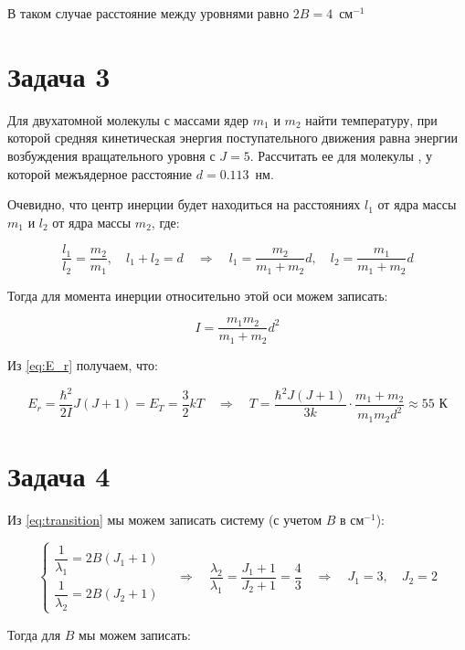 \documentclass[a4paper, 12pt]{article}
\newcommand{\qrq}
{\ensuremath{\quad \Rightarrow \quad}} %
\begin{document}
В таком случае расстояние между уровнями равно $2B = 4$~см$^{-1}$ 

\section*{Задача 3}

Для двухатомной молекулы с массами ядер $m_1$ и $m_2$ найти температуру, при которой средняя кинетическая энергия поступательного движения равна энергии возбуждения вращательного уровня с $J = 5$. Рассчитать ее для молекулы , у которой межъядерное расстояние $d= 0.113$~нм.

Очевидно, что центр инерции будет находиться на расстояниях $l_1$ от ядра массы $m_1$ и $l_2$ от ядра массы $m_2$, где:

\begin{equation}
	\frac{l_1}{l_2} = \frac{m_2}{m_1}, \quad l_1 + l_2 = d \qrq l_1 = \frac{m_2}{m_1 + m_2}d, \quad l_2 = \frac{m_1}{m_1 + m_2} d
\end{equation}

Тогда для момента инерции относительно этой оси можем записать:

\begin{equation}
	I = \frac{m_1 m_2}{m_1 + m_2} d^2
\end{equation}

Из \ref{eq:E_r} получаем, что:

\begin{equation}
	E_r = \frac{\hbar^2}{2I} J(J+1) = E_T = \frac{3}{2}kT \qrq T = \frac{\hbar^2 J(J+1)}{3k} \cdot \frac{m_1 + m_2}{m_1 m_2 d^2} \approx 55 \text{ К}
\end{equation}

\section*{Задача 4}

Из \ref{eq:transition} мы можем записать систему (с учетом $B$ в см$^{-1}$):

\begin{equation}
	\begin{cases*}
		\dfrac{1}{\lambda_1} = 2 B (J_1 + 1)\\
		\dfrac{1}{\lambda_2} = 2 B (J_2 + 1)
	\end{cases*} \qrq \frac{\lambda_2}{\lambda_1} = \frac{J_1 + 1}{J_2 + 1} = \frac{4}{3} \qrq J_1 = 3, \quad J_2 = 2
\end{equation}

Тогда для $B$ мы можем записать:
\end{document}
